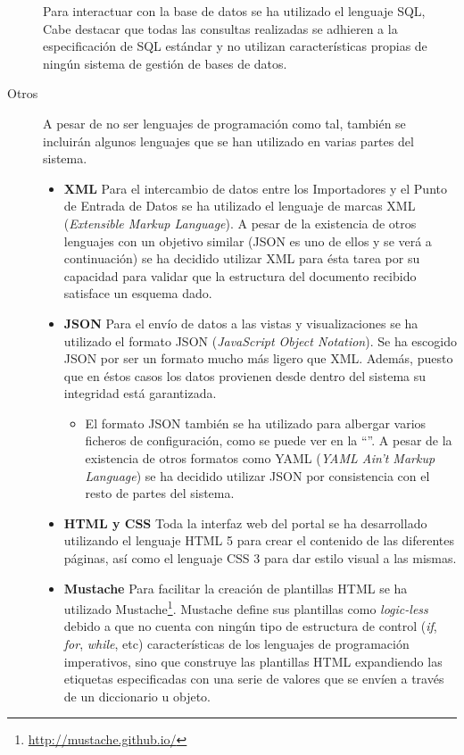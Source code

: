 \begin{description}
			Para interactuar con la base de datos se ha utilizado el lenguaje SQL, Cabe destacar que todas las consultas realizadas se adhieren a la especificación de SQL estándar y no utilizan características propias de ningún sistema de gestión de bases de datos.
		\item[Otros]
			A pesar de no ser lenguajes de programación como tal, también se incluirán algunos lenguajes que se han utilizado en varias partes del sistema.
			\begin{itemize}
				\item \textbf{XML}
					Para el intercambio de datos entre los Importadores y el Punto de Entrada de Datos se ha utilizado el lenguaje de marcas XML (\textit{Extensible Markup Language}).  A pesar de la existencia de otros lenguajes con un objetivo similar (JSON es uno de ellos y se verá a continuación) se ha decidido utilizar XML para ésta tarea por su capacidad para validar que la estructura del documento recibido satisface un esquema dado.
				\item \textbf{JSON}
					Para el envío de datos a las vistas y visualizaciones se ha utilizado el formato JSON (\textit{JavaScript Object Notation}).  Se ha escogido JSON por ser un formato mucho más ligero que XML.  Además, puesto que en éstos casos los datos provienen desde dentro del sistema su integridad está garantizada.
						\begin{itemize}
							\item
								El formato JSON también se ha utilizado para albergar varios ficheros de configuración, como se puede ver en la ``''.  A pesar de la existencia de otros formatos como YAML (\textit{YAML Ain't Markup Language}) se ha decidido utilizar JSON por consistencia con el resto de partes del sistema.
						\end{itemize}
					
				\item \textbf{HTML y CSS}
					Toda la interfaz web del portal se ha desarrollado utilizando el lenguaje HTML 5 para crear el contenido de las diferentes páginas, así como el lenguaje CSS 3 para dar estilo visual a las mismas.
					
				\item \textbf{Mustache}
					Para facilitar la creación de plantillas HTML se ha utilizado Mustache\footnote{\url{http://mustache.github.io/}}.  Mustache define sus plantillas como \textit{logic-less} debido a que no cuenta con ningún tipo de estructura de control (\textit{if}, \textit{for}, \textit{while}, etc) características de los lenguajes de programación imperativos, sino que construye las plantillas HTML expandiendo las etiquetas especificadas con una serie de valores que se envíen a través de un diccionario u objeto.
			\end{itemize}
	\end{description}


